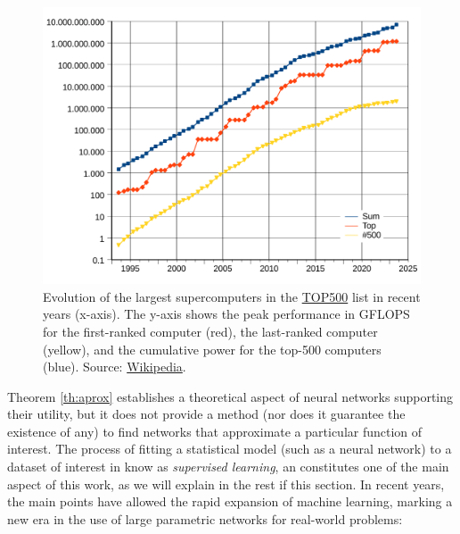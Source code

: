 \begin{figure}
    \centering
    \includegraphics[width=0.7\linewidth]{img/ML/HPC.png}
    \caption{Evolution of the largest supercomputers in the \href{https://top500.org}{\textsc{TOP500}} list  in recent years (x-axis). The y-axis shows the peak performance in GFLOPS for the first-ranked computer (red), the last-ranked computer (yellow), and the cumulative power for the top-500 computers (blue). Source: \href{https://en.wikipedia.org/wiki/History_of_supercomputing}{Wikipedia}.}
    \label{fig:ML_HPC}
\end{figure}


Theorem \ref{th:aprox} establishes a theoretical aspect of neural networks supporting their utility, but it does not provide a method (nor does it guarantee the existence of any) to find networks that approximate a particular function of interest. The process of fitting a statistical model (such as a neural network) to a dataset of interest in know as \emph{supervised learning}, an constitutes one of the main aspect of this work, as we will explain in the rest if this section.
In recent years, the main points have allowed the rapid expansion of machine learning, marking a new era in the use of large parametric networks for real-world problems:

